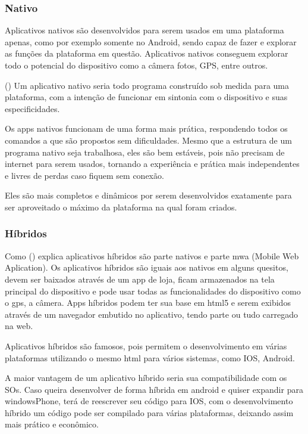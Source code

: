 \subsubsection{Nativo}
Aplicativos nativos são desenvolvidos para serem usados em uma plataforma apenas, como por exemplo somente no Android, sendo capaz de fazer e explorar as funções da plataforma em questão. Aplicativos nativos conseguem explorar todo o potencial do dispositivo como a câmera fotos, GPS, entre outros.

(\cite{nativo}) Um aplicativo nativo seria todo programa construído sob medida para uma plataforma, com a intenção de funcionar em sintonia com o dispositivo e suas especificidades.

Os apps nativos funcionam de uma forma mais prática, respondendo todos os comandos a que são propostos sem dificuldades. Mesmo que a estrutura de um programa nativo seja trabalhosa, eles são bem estáveis, pois não precisam de internet para serem usados, tornando a experiência e prática mais independentes e livres de perdas caso fiquem sem conexão.

Eles são mais completos e dinâmicos por serem desenvolvidos exatamente para ser aproveitado o máximo da plataforma na qual foram criados.

\subsubsection{Híbridos}

Como (\cite{hibrido}) explica aplicativos híbridos são parte nativos e parte mwa (Mobile Web Aplication).  Os aplicativos híbridos são iguais aos nativos em alguns quesitos, devem ser baixados através de um app de loja, ficam armazenados na tela principal do dispositivo e pode usar todas as funcionalidades do dispositivo como o gps, a câmera. Apps híbridos podem ter sua base em html5 e serem exibidos através de um navegador embutido no aplicativo, tendo parte ou tudo carregado na web.

Aplicativos híbridos são famosos, pois permitem o desenvolvimento em várias plataformas utilizando o mesmo html para vários sistemas, como IOS, Android.

A maior vantagem de um aplicativo híbrido seria sua compatibilidade com os SOs. Caso queira desenvolver de forma híbrida em android e quiser expandir para windowsPhone, terá de reescrever seu código para IOS, com o desenvolvimento híbrido um código pode ser compilado para várias plataformas, deixando assim mais prático e econômico.

\newpage 